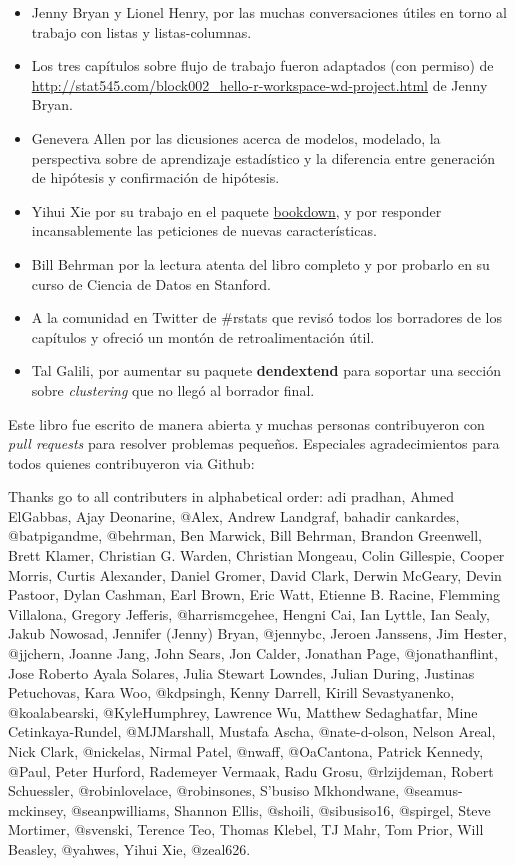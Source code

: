 \documentclass[11pt,oneside]{report}
\begin{document}
\begin{itemize}
\item
  Jenny Bryan y Lionel Henry, por las muchas conversaciones útiles en
  torno al trabajo con listas y listas-columnas.
\item
  Los tres capítulos sobre flujo de trabajo fueron adaptados (con
  permiso) de
  \url{http://stat545.com/block002_hello-r-workspace-wd-project.html} de
  Jenny Bryan.
\item
  Genevera Allen por las dicusiones acerca de modelos, modelado, la
  perspectiva sobre de aprendizaje estadístico y la diferencia entre
  generación de hipótesis y confirmación de hipótesis.
\item
  Yihui Xie por su trabajo en el paquete
  \href{https://github.com/rstudio/bookdown}{bookdown}, y por responder
  incansablemente las peticiones de nuevas características.
\item
  Bill Behrman por la lectura atenta del libro completo y por probarlo
  en su curso de Ciencia de Datos en Stanford.
\item
  A la comunidad en Twitter de \#rstats que revisó todos los borradores
  de los capítulos y ofreció un montón de retroalimentación útil.
\item
  Tal Galili, por aumentar su paquete \textbf{dendextend} para soportar
  una sección sobre \emph{clustering} que no llegó al borrador final.
\end{itemize}

Este libro fue escrito de manera abierta y muchas personas contribuyeron
con \emph{pull requests} para resolver problemas pequeños. Especiales
agradecimientos para todos quienes contribuyeron via Github:

Thanks go to all contributers in alphabetical order: adi pradhan, Ahmed
ElGabbas, Ajay Deonarine, @Alex, Andrew Landgraf, bahadir cankardes,
@batpigandme, @behrman, Ben Marwick, Bill Behrman, Brandon Greenwell,
Brett Klamer, Christian G. Warden, Christian Mongeau, Colin Gillespie,
Cooper Morris, Curtis Alexander, Daniel Gromer, David Clark, Derwin
McGeary, Devin Pastoor, Dylan Cashman, Earl Brown, Eric Watt, Etienne B.
Racine, Flemming Villalona, Gregory Jefferis, @harrismcgehee, Hengni
Cai, Ian Lyttle, Ian Sealy, Jakub Nowosad, Jennifer (Jenny) Bryan,
@jennybc, Jeroen Janssens, Jim Hester, @jjchern, Joanne Jang, John
Sears, Jon Calder, Jonathan Page, @jonathanflint, Jose Roberto Ayala
Solares, Julia Stewart Lowndes, Julian During, Justinas Petuchovas, Kara
Woo, @kdpsingh, Kenny Darrell, Kirill Sevastyanenko, @koalabearski,
@KyleHumphrey, Lawrence Wu, Matthew Sedaghatfar, Mine Cetinkaya-Rundel,
@MJMarshall, Mustafa Ascha, @nate-d-olson, Nelson Areal, Nick Clark,
@nickelas, Nirmal Patel, @nwaff, @OaCantona, Patrick Kennedy, @Paul,
Peter Hurford, Rademeyer Vermaak, Radu Grosu, @rlzijdeman, Robert
Schuessler, @robinlovelace, @robinsones, S'busiso Mkhondwane,
@seamus-mckinsey, @seanpwilliams, Shannon Ellis, @shoili, @sibusiso16,
@spirgel, Steve Mortimer, @svenski, Terence Teo, Thomas Klebel, TJ Mahr,
Tom Prior, Will Beasley, @yahwes, Yihui Xie, @zeal626.
\end{document}
